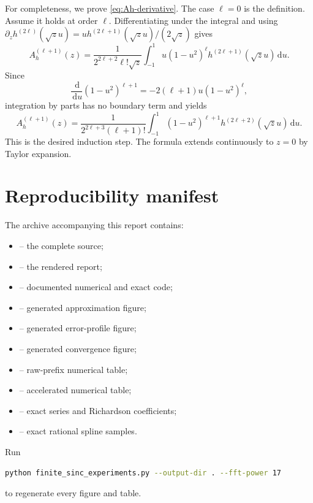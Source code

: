 \documentclass[11pt]{article}
\theoremstyle{definition}
\theoremstyle{remark}
\newcommand{\dd}{\,\mathrm d}
\begin{document}
For completeness, we prove \cref{eq:Ah-derivative}.  The case $\ell=0$ is the
definition.  Assume it holds at order $\ell$.  Differentiating under the integral and
using $\partial_z h^{(2\ell)}(\sqrt z u)
=u h^{(2\ell+1)}(\sqrt z u)/(2\sqrt z)$ gives
\[
 A_h^{(\ell+1)}(z)
 =\frac{1}{2^{2\ell+2}\ell!\sqrt z}
 \int_{-1}^{1}u(1-u^2)^\ell h^{(2\ell+1)}(\sqrt z u)\dd u.
\]
Since
\[
 \frac{\dd}{\dd u}(1-u^2)^{\ell+1}
 =-2(\ell+1)u(1-u^2)^\ell,
\]
integration by parts has no boundary term and yields
\[
 A_h^{(\ell+1)}(z)
 =\frac{1}{2^{2\ell+3}(\ell+1)!}
 \int_{-1}^{1}(1-u^2)^{\ell+1}h^{(2\ell+2)}(\sqrt z u)\dd u.
\]
This is the desired induction step.  The formula extends continuously to $z=0$ by
Taylor expansion.

\section{Reproducibility manifest}
\label{app:manifest}

The archive accompanying this report contains:
\begin{itemize}[leftmargin=2em]
\item {} -- the complete source;
\item {} -- the rendered report;
\item {} -- documented numerical and exact code;
\item {} -- generated approximation figure;
\item {} -- generated error-profile figure;
\item {} -- generated convergence figure;
\item {} -- raw-prefix numerical table;
\item {} -- accelerated numerical table;
\item {} -- exact series and Richardson coefficients;
\item {} -- exact rational spline samples.
\end{itemize}
Run
\begin{lstlisting}[style=reportcode,language=bash]
python finite_sinc_experiments.py --output-dir . --fft-power 17
\end{lstlisting}
to regenerate every figure and table.
\end{document}
